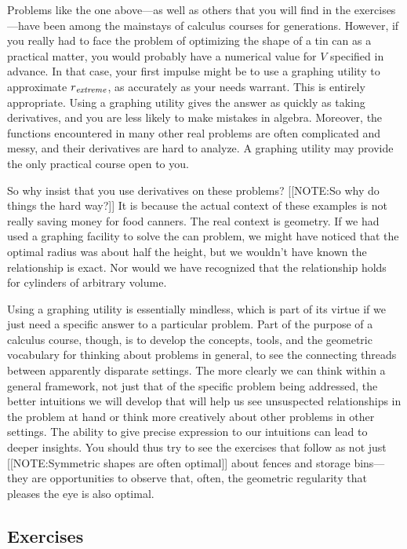 Problems like the one
above---as well as others that you will find in the exercises---have
been among the mainstays of calculus courses for generations.
However, if you really had to face the problem of optimizing the shape
of a tin can as a practical matter, you would probably have a
numerical value for $V$ specified in advance.  In that case, your
first impulse might be to use a graphing utility to approximate
$r_{\it extreme}$, as accurately as your needs warrant.  This is
entirely appropriate.  Using a graphing utility gives the answer as
quickly as taking derivatives, and you are less likely to make
mistakes in algebra.  Moreover, the functions encountered in many
other real problems are often complicated and messy, and their
derivatives are hard to analyze.  A graphing utility may provide the
only practical course open to you.


So why insist that you use derivatives on these problems?
[[NOTE:So why do things  the hard way?]]
It is because the actual context of these examples is not really
saving money for food canners.  The real context is geometry.  If we
had used a graphing facility to solve the can problem, we might have
noticed that the optimal radius was about half the height, but we
wouldn't have known the relationship is exact.  Nor would we have
recognized that the relationship holds for cylinders of arbitrary
volume.

Using a graphing utility is essentially mindless, which is part of its
virtue if we just need a specific answer to a particular problem.
Part of the purpose of a calculus course, though, is to develop the
concepts, tools, and the geometric vocabulary for thinking about
problems in general, to see the connecting threads between apparently
disparate settings.  The more clearly we can think within a general
framework, not just that of the specific problem being addressed, the
better intuitions we will develop that will help us see unsuspected
relationships in the problem at hand or think more creatively about
other problems in other settings. The ability to give precise
expression to our intuitions can lead to deeper insights.  You should
thus try to see the exercises that follow as not just
[[NOTE:Symmetric shapes  are often optimal]]     
about fences and storage bins---they are opportunities to observe
that, often, the geometric regularity that pleases the eye is also
optimal.




\subsection{Exercises}
\label{subsec:exercises}

